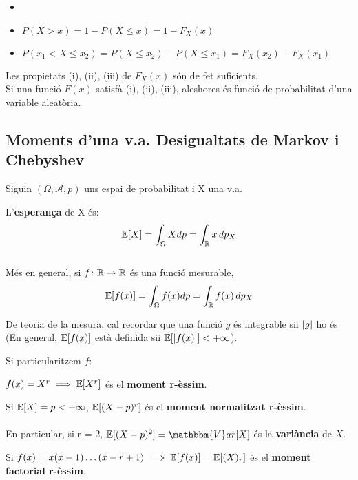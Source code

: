 \begin{obs}
  \begin{itemize}
      \item []
      \item $P(X > x) = 1 - P(X\leq x) = 1 - F_{X}(x)$
      \item $P(x_{1} < X \leq x_{2}) = P(X \leq x_{2}) - P(X \leq x_{1}) = F_{X}(x_{2}) - F_{X}(x_{1})$
  \end{itemize}
\end{obs}

\begin{obs}
  Les propietats (i), (ii), (iii) de $F_{X}(x)$ són de fet suficients.\\
  Si una funció $F(x)$ satisfà (i), (ii), (iii), aleshores és funció de probabilitat d'una variable aleatòria.
\end{obs}
\newpage
\subsection{Moments d'una v.a.  Desigualtats de Markov i Chebyshev}

Siguin $(\Omega, \mathcal{A}, p)$ uns espai de probabilitat i X una v.a.\\
\begin{defi}
  L'\textbf{esperança} de X és: 
  \[
  \mathbb{E}[X] = \int_{\Omega}X dp = \int_{\mathbb{R}} x \, dp_{X}
  \]
  \\
  Més en general, si $f\colon \mathbb{R} \to \mathbb{R}$ és una funció mesurable, 
  \[
    \mathbb{E}[f(x)] = \int_{\Omega}f(x) dp = \int_{\mathbb{R}} f(x) \, dp_{X}
  \]
\end{defi}

\begin{obs}
  De teoria de la mesura, cal recordar que una funció $g$ és integrable sii $\left\vert g \right\vert$ ho és
  (En general, $\mathbb{E}[f(x)]$ està definida sii $\mathbb{E}[\left\vert f(x) \right\vert]<+\infty$). \\
\end{obs}

Si particularitzem $f$:

\begin{defi}
  $f(x) = X^{r} \implies \mathbb{E}[X^{r}]$ és el \textbf{moment r-èssim}.
\end{defi}

\begin{defi}
  Si $\mathbb{E}[X] = p < +\infty$, $\mathbb{E}[(X-p)^{r}]$ és el \textbf{moment normalitzat r-èssim}.\\\\
  En particular, si r = 2, $\E[(X-p)^{2}] = \mathbbm{V}ar[X]$ és la \textbf{variància} de $X$.
\end{defi}

\begin{defi}
  Si $f(x) = x(x-1)\ldots(x-r+1) \implies \mathbb{E}[f(x)] = \mathbb{E}[(X)_r]$ és el \textbf{moment factorial r-èssim}.
\end{defi}

